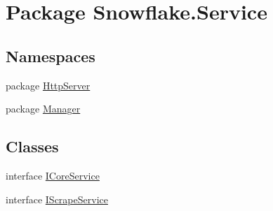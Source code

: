 \hypertarget{namespace_snowflake_1_1_service}{}\section{Package Snowflake.\+Service}
\label{namespace_snowflake_1_1_service}
\subsection*{Namespaces}
\begin{DoxyCompactItemize}
\item 
package \hyperlink{namespace_snowflake_1_1_service_1_1_http_server}{Http\+Server}
\item 
package \hyperlink{namespace_snowflake_1_1_service_1_1_manager}{Manager}
\end{DoxyCompactItemize}
\subsection*{Classes}
\begin{DoxyCompactItemize}
\item 
interface \hyperlink{interface_snowflake_1_1_service_1_1_i_core_service}{I\+Core\+Service}
\item 
interface \hyperlink{interface_snowflake_1_1_service_1_1_i_scrape_service}{I\+Scrape\+Service}
\end{DoxyCompactItemize}
